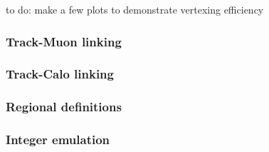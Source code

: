{\color{red} to do: make a few plots to demonstrate vertexing efficiency}



\subsubsection{Track-Muon linking}
\subsubsection{Track-Calo linking}
\subsubsection{Regional definitions}
\subsubsection{Integer emulation}